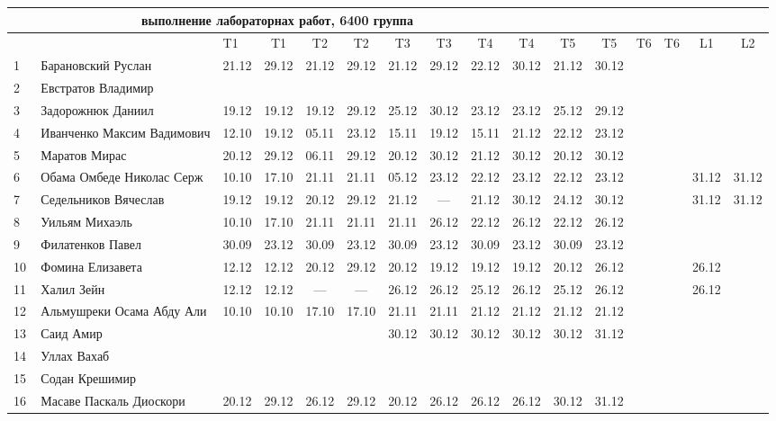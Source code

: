 \documentclass[a4paper,landscape,11pt]{article}
\begin{document}
\newpage
%
\begin{tabular}{l|llccc|cccc|cccccc}
\multicolumn{10}{c}{выполнение лабораторнах работ, 6400 группа} \\
\toprule
&&T1&T1& T2&T2& T3&T3& T4&T4&T5&T5&T6&T6&L1&L2\\
\midrule
1\,&  Барановский Руслан         &21.12& 29.12& 21.12& 29.12& 21.12& 29.12& 22.12& 30.12& 21.12& 30.12\\
2\,&  Евстратов Владимир         &&&&&&&&\\
3\,&  Задорожнюк Даниил          &19.12& 19.12& 19.12& 29.12& 25.12& 30.12& 23.12& 23.12& 25.12& 29.12\\ %
4\,&  Иванченко Максим Вадимович &12.10& 19.12& 05.11& 23.12& 15.11& 19.12& 15.11& 21.12& 22.12& 23.12\\ %
5\,&  Маратов Мирас              &20.12& 29.12& 06.11& 29.12& 20.12& 30.12& 21.12& 30.12& 20.12& 30.12\\ %
\midrule
6\,&  Обама Омбеде Николас Серж  &10.10& 17.10& 21.11& 21.11& 05.12& 23.12& 22.12& 23.12& 22.12& 23.12&&&31.12&31.12\\   %
7\,&  Седельников Вячеслав       &19.12& 19.12& 20.12& 29.12& 21.12&  --- & 21.12& 30.12& 24.12& 30.12&&&31.12&31.12\\   %
8\,&  Уильям Михаэль             &10.10& 17.10& 21.11& 21.11& 21.11& 26.12& 22.12& 26.12& 22.12& 26.12\\   %
9\,&  Филатенков Павел           &30.09 &23.12& 30.09& 23.12& 30.09& 23.12& 30.09& 23.12& 30.09& 23.12\\
10\,& Фомина Елизавета           &12.12& 12.12& 20.12& 29.12& 20.12& 19.12& 19.12& 19.12& 20.12& 26.12&&& 26.12 \\  %
\midrule
11\,& Халил Зейн                 &12.12& 12.12&  --- &  --- & 26.12& 26.12& 25.12& 26.12& 25.12& 26.12&&& 26.12\\ %
12\,& Альмушреки Осама Абду Али  &10.10& 10.10& 17.10& 17.10& 21.11& 21.11& 21.12& 21.12& 21.12& 21.12\\   %
13\,& Саид Амир                  &     &      &      &      & 30.12& 30.12& 30.12& 30.12& 30.12& 31.12\\ %
14\,& Уллах Вахаб                &&&&&&&&\\
15\,& Содан Крешимир             &&&&&&&&\\
16\,& Масаве Паскаль Диоскори    &20.12& 29.12& 26.12& 29.12& 20.12& 26.12& 26.12& 26.12& 30.12& 31.12    \\ %
\bottomrule
\end{tabular}
\end{document}
